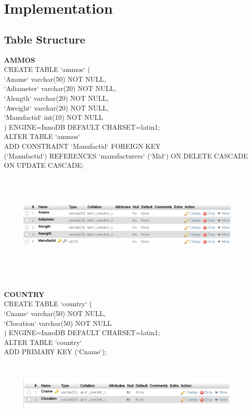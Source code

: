 \documentclass[12pt,a4paper]{report}
\begin{document}
\chapter{Implementation}
\section{Table Structure}
\textbf{AMMOS}\\
CREATE TABLE `ammos` (\\
  `Aname` varchar(50) NOT NULL,\\
  `Adiameter` varchar(20) NOT NULL,\\
  `Alength` varchar(20) NOT NULL,\\
  `Aweight` varchar(20) NOT NULL,\\
  `Manufactid` int(10) NOT NULL\\
) ENGINE=InnoDB DEFAULT CHARSET=latin1;\\
ALTER TABLE `ammos`\\
  ADD CONSTRAINT `Manufactid` FOREIGN KEY\\ (`Manufactid`) REFERENCES `manufacturers` (`Mid`) ON DELETE CASCADE ON UPDATE CASCADE;
\begin{figure}[hbtp]
\centering
\includegraphics[width=6.0in,height=2in]{../fig/Ammos}\\
\end{figure}\\
\newpage
\textbf{COUNTRY}\\
CREATE TABLE `country` (\\
  `Cname` varchar(50) NOT NULL,\\
  `Clocation` varchar(50) NOT NULL\\
) ENGINE=InnoDB DEFAULT CHARSET=latin1;\\
ALTER TABLE `country`\\
ADD PRIMARY KEY (`Cname`);
\begin{figure}[hbtp]
\centering
\includegraphics[width=6.0in,height=1.25in]{../fig/Country}\\
\end{figure}
\end{document}
